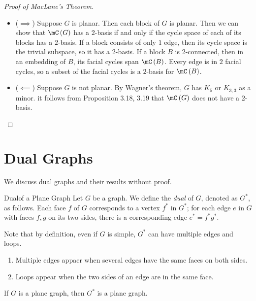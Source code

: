 \documentclass[co342]{subfiles}
\begin{document}
    \begin{proof}[Proof of MacLane's Theorem]
        \begin{itemize}
            \item ($\implies$) Suppose $G$ is planar. Then each block of $G$ is planar. Then we can show that $\mC\left( G \right)$ has a $2$-basis if and only if the cycle space of each of its blocks has a $2$-basis. If a block consists of only $1$ edge, then its cycle space is the trivial subspace, so it has a $2$-basis. If a block $B$ is $2$-connected, then in an embedding of $B$, its facial cycles span $\mC\left( B \right)$. Every edge is in $2$ facial cycles, so a subset of the facial cycles is a $2$-basis for $\mC\left( B \right)$.

            \item ($\impliedby$) Suppose $G$ is not planar. By Wagner's theorem, $G$ has $K_5$ or $K_{3,3}$ as a minor. it follows from Proposition 3.18, 3.19 that $\mC\left( G \right)$ does not have a $2$-basis. \qqedsym
        \end{itemize} 
    \end{proof}

    \section{Dual Graphs}
    
    \np We discuss dual graphs and their results without proof.

    \begin{definition}{Dual}{of a Plane Graph}
        Let $G$ be a graph. We define the \emph{dual} of $G$, denoted as $G^{*}$, as follows. Each face $f$ of $G$ corresponds to a vertex $f^{*}$ in $G^{*}$; for each edge $e$ in $G$ with faces $f,g$ on its two sides, there is a corresponding edge $e^{*}=f^{*}g^{*}$.
    \end{definition}

    \noindent Note that by definition, even if $G$ is simple, $G^{*}$ can have multiple edges and loops.
    \begin{enumerate}
        \item Multiple edges appaer when several edges have the same faces on both sides.
        \item Loops appear when the two sides of an edge are in the same face.
    \end{enumerate}

    \begin{prop}{}
        If $G$ is a plane graph, then $G^{*}$ is a plane graph.
    \end{prop}
\end{document}
